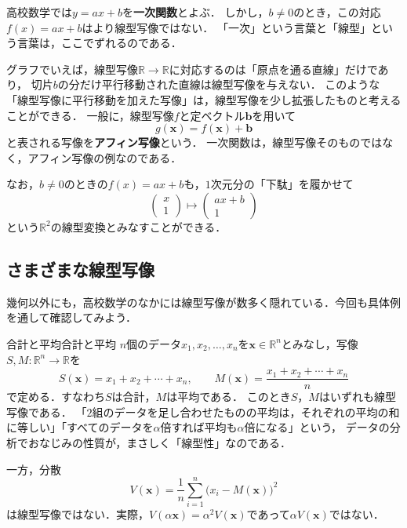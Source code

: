 \begin{mycolumn}
  高校数学では$y = ax + b$を\textbf{一次関数}とよぶ．
  しかし，$b \ne 0$のとき，この対応$f(x) = ax + b$はより線型写像ではない．
  「一次」という言葉と「線型」という言葉は，ここでずれるのである．

  グラフでいえば，線型写像$\mathbb{R} \to \mathbb{R}$に対応するのは「原点を通る直線」だけであり，
  切片$b$の分だけ平行移動された直線は線型写像を与えない．
  このような「線型写像に平行移動を加えた写像」は，線型写像を少し拡張したものと考えることができる．
  一般に，線型写像$f$と定ベクトル$\bm{b}$を用いて
  \[
    g(\bm{x}) = f(\bm{x}) + \bm{b}
  \]
  と表される写像を\textbf{アフィン写像}という．
  一次関数は，線型写像そのものではなく，アフィン写像の例なのである．

  なお，$b \ne 0$のときの$f(x) = ax + b$も，$1$次元分の「下駄」を履かせて
  \[
    \begin{pmatrix} x \\ 1 \end{pmatrix}
    \longmapsto
    \begin{pmatrix} ax + b \\ 1 \end{pmatrix}
  \]
  という$\mathbb{R}^2$の線型変換とみなすことができる．
\end{mycolumn}

\subsection{さまざまな線型写像}

幾何以外にも，高校数学のなかには線型写像が数多く隠れている．今回も具体例を通して確認してみよう．

\begin{example}{合計と平均}{合計と平均}
  $n$個のデータ$x_1, x_2, \dots, x_n$を$\bm{x} \in \mathbb{R}^n$とみなし，写像$S, M \colon \mathbb{R}^n \to \mathbb{R}$を
  \[
    S(\bm{x}) = x_1 + x_2 + \cdots + x_n, \qquad
    M(\bm{x}) = \frac{x_1 + x_2 + \cdots + x_n}{n}
  \]
  で定める．すなわち$S$は合計，$M$は平均である．
  このとき$S$，$M$はいずれも線型写像である．
  「$2$組のデータを足し合わせたものの平均は，それぞれの平均の和に等しい」「すべてのデータを$\alpha$倍すれば平均も$\alpha$倍になる」という，
  データの分析でおなじみの性質が，まさしく「線型性」なのである．

  一方，分散
  \[
    V(\bm{x}) = \frac{1}{n}\sum_{i=1}^{n} \bigl(x_i - M(\bm{x})\bigr)^2
  \]
  は線型写像ではない．実際，$V(\alpha\bm{x}) = \alpha^2 V(\bm{x})$であって$\alpha V(\bm{x})$ではない．
\end{example}

